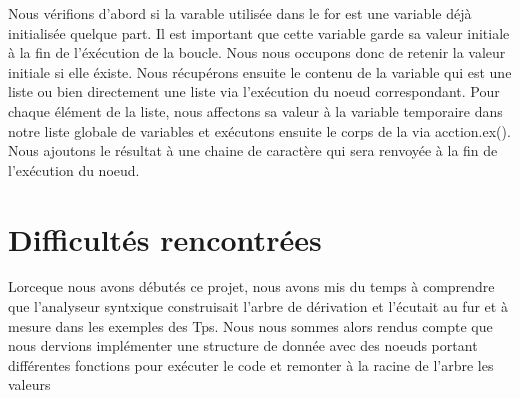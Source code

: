\documentclass[a4paper,10pt]{article}
\begin{document}
Nous vérifions d'abord si la varable utilisée dans le for est une variable déjà initialisée quelque part. Il est important que cette variable garde sa valeur
initiale à la fin de l'éxécution de la boucle. Nous nous occupons donc de retenir la valeur initiale si elle éxiste. Nous récupérons ensuite le contenu de la 
variable qui est une liste ou bien directement une liste via l'exécution du noeud correspondant. Pour chaque élément de la liste, nous affectons sa valeur à la variable
temporaire dans notre liste globale de variables et exécutons ensuite le corps de la via acction.ex(). Nous ajoutons le résultat à une chaine de caractère qui
sera renvoyée à la fin de l'exécution du noeud.

\section{Difficultés rencontrées}
Lorceque nous avons débutés ce projet, nous avons mis du temps à comprendre que l'analyseur syntxique construisait l'arbre de dérivation et l'écutait au fur 
et à mesure dans les exemples des Tps. Nous nous sommes alors rendus compte que nous dervions implémenter une structure de donnée avec des noeuds portant différentes
fonctions pour exécuter le code et remonter à la racine de l'arbre les valeurs
\end{document}
